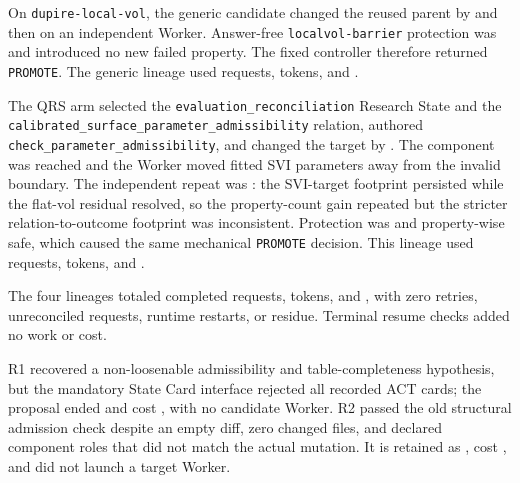 On \texttt{dupire-local-vol}, the generic candidate changed the reused parent by
\AZeroGenericTarget{} and then \AZeroGenericRepeat{} on an independent Worker.
Answer-free \texttt{localvol-barrier} protection was
\AZeroGenericProtection{} and introduced no new failed property. The fixed
controller therefore returned \texttt{PROMOTE}. The generic lineage used
\AZeroGenericRequests{} requests, \AZeroGenericTokens{} tokens, and
\AZeroGenericCost{}.

The QRS arm selected the \texttt{evaluation\_reconciliation} Research State and
the \texttt{calibrated\_surface\_parameter\_admissibility} relation, authored
\texttt{check\_parameter\_admissibility}, and changed the target by
\AZeroQRSTarget{}. The component was reached and the Worker moved fitted SVI
parameters away from the invalid boundary. The independent repeat was
\AZeroQRSRepeat{}: the SVI-target footprint persisted while the flat-vol
residual resolved, so the property-count gain repeated but the stricter
relation-to-outcome footprint was inconsistent. Protection was
\AZeroQRSProtection{} and property-wise safe, which caused the same mechanical
\texttt{PROMOTE} decision. This lineage used \AZeroQRSRequests{} requests,
\AZeroQRSTokens{} tokens, and \AZeroQRSCost{}.

The four lineages totaled \AZeroTotalRequests{} completed requests,
\AZeroTotalTokens{} tokens, and \AZeroTotalCost{}, with zero retries,
unreconciled requests, runtime restarts, or residue. Terminal resume checks
added no work or cost. 

 R1 recovered a non-loosenable admissibility and
table-completeness hypothesis, but the mandatory State Card interface rejected
all recorded ACT cards; the proposal ended \AOneROneDecision{} and cost
\AOneROneCost{}, with no candidate Worker. R2 passed the old structural
admission check despite an empty diff, zero changed files, and declared
component roles that did not match the actual mutation. It is retained as
\AOneRTwoDecision{}, cost \AOneRTwoCost{}, and did not launch a target Worker.

